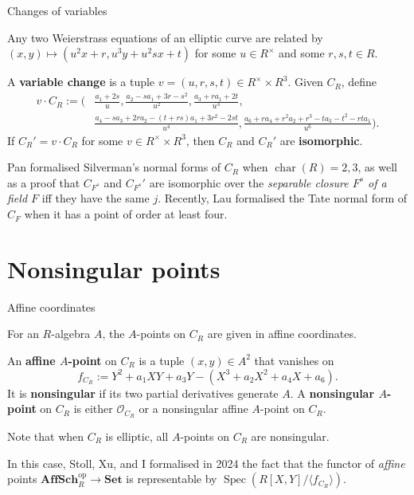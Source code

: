 \documentclass[10pt]{beamer}
\begin{document}
\begin{frame}[t]{Changes of variables}

Any two Weierstrass equations of an elliptic curve are related by $ (x, y) \mapsto (u^2x + r, u^3y + u^2sx + t) $ for some $ u \in R^\times $ and some $ r, s, t \in R $.

\begin{definition}
A \textbf{variable change} is a tuple $ v = (u, r, s, t) \in R^\times \times R^3 $. Given $ C_R $, define
\begin{align*}
v \cdot C_R
:= ( & \tfrac{a_1 + 2s}{u}, \tfrac{a_2 - sa_1 + 3r - s^2}{u^2}, \tfrac{a_3 + ra_1 + 2t}{u^3}, \\
& \tfrac{a_4 - sa_3 + 2ra_2 - (t + rs)a_1 + 3r^2 - 2st}{u^4}, \tfrac{a_6 + ra_4 + r^2a_2 + r^3 - ta_3 - t^2 - rta_1}{u^6}).
\end{align*}
If $ C_R' = v \cdot C_R $ for some $ v \in R^\times \times R^3 $, then $ C_R $ and $ C_R' $ are \textbf{isomorphic}.
\end{definition}

Pan formalised Silverman's normal forms of $ C_R $ when $ \operatorname{char}(R) = 2, 3 $, as well as a proof that $ C_{F^s} $ and $ C_{F^s}' $ are isomorphic over the \emph{separable closure $ F^s $ of a field $ F $} iff they have the same $ j $. Recently, Lau formalised the Tate normal form of $ C_F $ when it has a point of order at least four.

\end{frame}

\section{Nonsingular points}

\begin{frame}[t]{Affine coordinates}

For an $ R $-algebra $ A $, the $ A $-points on $ C_R $ are given in affine coordinates.

\begin{definition}
An \textbf{affine $ A $-point} on $ C_R $ is a tuple $ (x, y) \in A^2 $ that vanishes on
$$ f_{C_R} := Y^2 + a_1XY + a_3Y - (X^3 + a_2X^2 + a_4X + a_6). $$
It is \textbf{nonsingular} if its two partial derivatives generate $ A $. A \textbf{nonsingular $ A $-point} on $ C_R $ is either $ \mathcal{O}_{C_R} $ or a nonsingular affine $ A $-point on $ C_R $.
\end{definition}

Note that when $ C_R $ is elliptic, all $ A $-points on $ C_R $ are nonsingular.

\vspace{0.5cm} In this case, Stoll, Xu, and I formalised in 2024 the fact that the functor of \emph{affine} points $ \mathbf{AffSch}_R^{\text{op}} \to \mathbf{Set} $ is representable by $ \operatorname{Spec}(R[X, Y] / \langle f_{C_R}\rangle) $.

\end{frame}
\end{document}
